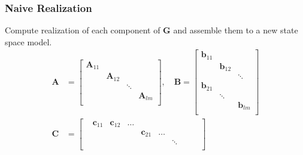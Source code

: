 \subsubsection{Naive Realization}
Compute realization of each component of $\mathbf{G}$ and assemble them to a new state space model.
\begin{align*}
    \mathbf{A} & =\begin{bmatrix}
                      \mathbf{A}_{11} &                 &        &                 \\
                                      & \mathbf{A}_{12} &        &                 \\
                                      &                 & \ddots &                 \\
                                      &                 &        & \mathbf{A}_{lm} \\
                  \end{bmatrix},
    \quad \mathbf{B}  =\begin{bmatrix}
                           \mathbf{b}_{11} &                 &                 \\
                                           & \mathbf{b}_{12} &                 \\
                                           &                 & \ddots          \\
                           \mathbf{b}_{21} &                 &                 \\
                                           & \ddots          &                 \\
                                           &                 & \mathbf{b}_{lm} \\
                       \end{bmatrix}                                                                    \\
    \mathbf{C} & =\begin{bmatrix}
                       & \mathbf{c}_{11} & \mathbf{c}_{12} & \dots &                 &       &        &                 &       &                 \\
                       &                 &                 &       & \mathbf{c}_{21} & \dots &        &                 &       &                 \\
                       &                 &                 &       &                 &       & \ddots &                 &       &                 \\

\end{bmatrix}
\end{align*}
